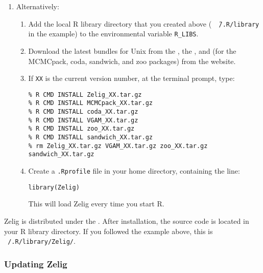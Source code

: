 \begin{enumerate}
\item \label{unix.manual} Alternatively: 
  \begin{enumerate}
  \item Add the local R library directory that you created above ({\tt
      \~\,/.R/library} in the example) to the environmental variable
    {\tt R\_LIBS}.
  \item Download the latest bundles for Unix from the , the
    , and (for the MCMCpack, coda, sandwich, and zoo packages) from the  website.
  \item If {\tt XX} is the current version number, at the terminal
    prompt, type:
\begin{verbatim}
% R CMD INSTALL Zelig_XX.tar.gz
% R CMD INSTALL MCMCpack_XX.tar.gz
% R CMD INSTALL coda_XX.tar.gz
% R CMD INSTALL VGAM_XX.tar.gz
% R CMD INSTALL zoo_XX.tar.gz
% R CMD INSTALL sandwich_XX.tar.gz
% rm Zelig_XX.tar.gz VGAM_XX.tar.gz zoo_XX.tar.gz sandwich_XX.tar.gz
\end{verbatim}
\item Create a {\tt .Rprofile} file in your home directory, containing the line:  
\begin{verbatim}
library(Zelig)
\end{verbatim}
This will load Zelig every time you start R.  
  \end{enumerate}
\end{enumerate}

Zelig is distributed under the .  After
installation, the source code is located in your R library directory.
If you followed the example above, this is {\tt ~/.R/library/Zelig/}.

\subsubsection{Updating Zelig} \label{sss:unix.updating}

